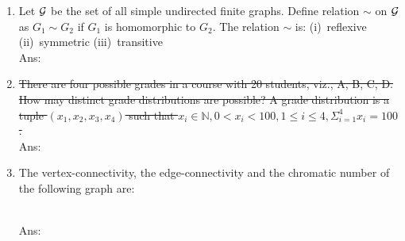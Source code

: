 \documentclass[10pt, letterpaper]{article}
\newcommand{\eat}[1]{}
\begin{document}
\begin{enumerate}\item Let $\cal{G}$ be the set of all simple undirected finite graphs. Define relation $\sim$ on $\cal{G}$ as $G_1 \sim G_2$ if $G_1$ is homomorphic to $G_2$. The relation $\sim$ is: (i)~reflexive (ii)~symmetric (iii)~transitive\\
Ans:



\item \sout{There are four possible grades in a course with 20 students, viz., A, B, C, D. How may distinct grade distributions are possible? A grade distribution is a tuple $(x_1, x_2, x_3, x_4)$ such that $x_i \in \mathbb{N}, 0 < x_i < 100 , 1 \leq i \leq 4, \Sigma_{i=1}^4 x_i = 100$.} \\
Ans:



\item The vertex-connectivity, the edge-connectivity and the chromatic number of the following graph are:
\begin{figure*}[h]
\centering
\end{figure*}\\
Ans:

\begin{enumerate*}\item  2 \eat{*}
	

\end{enumerate*}
\end{enumerate}
\end{document}

